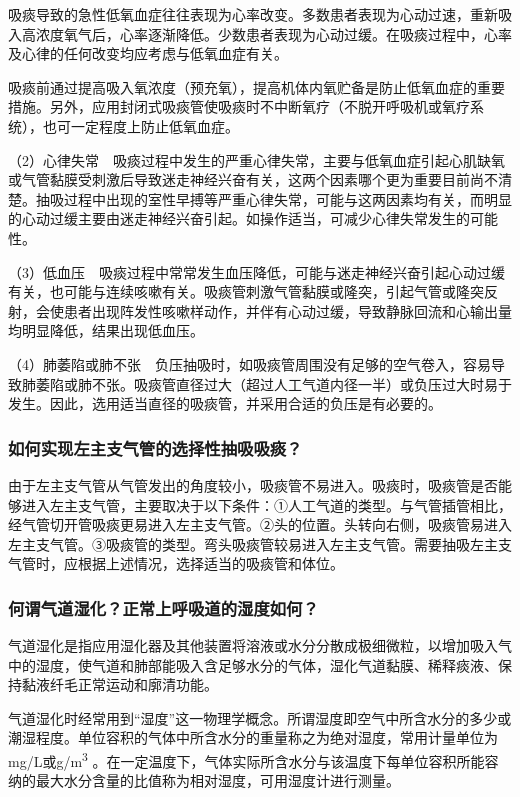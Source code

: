 吸痰导致的急性低氧血症往往表现为心率改变。多数患者表现为心动过速，重新吸入高浓度氧气后，心率逐渐降低。少数患者表现为心动过缓。在吸痰过程中，心率及心律的任何改变均应考虑与低氧血症有关。

吸痰前通过提高吸入氧浓度（预充氧），提高机体内氧贮备是防止低氧血症的重要措施。另外，应用封闭式吸痰管使吸痰时不中断氧疗（不脱开呼吸机或氧疗系统），也可一定程度上防止低氧血症。

（2）心律失常　吸痰过程中发生的严重心律失常，主要与低氧血症引起心肌缺氧或气管黏膜受刺激后导致迷走神经兴奋有关，这两个因素哪个更为重要目前尚不清楚。抽吸过程中出现的室性早搏等严重心律失常，可能与这两因素均有关，而明显的心动过缓主要由迷走神经兴奋引起。如操作适当，可减少心律失常发生的可能性。

（3）低血压　吸痰过程中常常发生血压降低，可能与迷走神经兴奋引起心动过缓有关，也可能与连续咳嗽有关。吸痰管刺激气管黏膜或隆突，引起气管或隆突反射，会使患者出现阵发性咳嗽样动作，并伴有心动过缓，导致静脉回流和心输出量均明显降低，结果出现低血压。

（4）肺萎陷或肺不张　负压抽吸时，如吸痰管周围没有足够的空气卷入，容易导致肺萎陷或肺不张。吸痰管直径过大（超过人工气道内径一半）或负压过大时易于发生。因此，选用适当直径的吸痰管，并采用合适的负压是有必要的。

\subsubsection{如何实现左主支气管的选择性抽吸吸痰？}

由于左主支气管从气管发出的角度较小，吸痰管不易进入。吸痰时，吸痰管是否能够进入左主支气管，主要取决于以下条件：①人工气道的类型。与气管插管相比，经气管切开管吸痰更易进入左主支气管。②头的位置。头转向右侧，吸痰管易进入左主支气管。③吸痰管的类型。弯头吸痰管较易进入左主支气管。需要抽吸左主支气管时，应根据上述情况，选择适当的吸痰管和体位。

\subsubsection{何谓气道湿化？正常上呼吸道的湿度如何？}

气道湿化是指应用湿化器及其他装置将溶液或水分分散成极细微粒，以增加吸入气中的湿度，使气道和肺部能吸入含足够水分的气体，湿化气道黏膜、稀释痰液、保持黏液纤毛正常运动和廓清功能。

气道湿化时经常用到“湿度”这一物理学概念。所谓湿度即空气中所含水分的多少或潮湿程度。单位容积的气体中所含水分的重量称之为绝对湿度，常用计量单位为mg/L或g/m\textsuperscript{3}
。在一定温度下，气体实际所含水分与该温度下每单位容积所能容纳的最大水分含量的比值称为相对湿度，可用湿度计进行测量。

